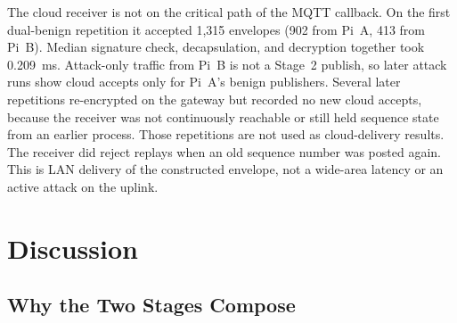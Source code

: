 \documentclass[journal]{IEEEtran}
\begin{document}
The cloud receiver is not on the critical path of the MQTT callback. On the first dual-benign repetition it accepted 1,315 envelopes (902 from Pi~A, 413 from Pi~B). Median signature check, decapsulation, and decryption together took 0.209~ms. Attack-only traffic from Pi~B is not a Stage~2 publish, so later attack runs show cloud accepts only for Pi~A's benign publishers. Several later repetitions re-encrypted on the gateway but recorded no new cloud accepts, because the receiver was not continuously reachable or still held sequence state from an earlier process. Those repetitions are not used as cloud-delivery results. The receiver did reject replays when an old sequence number was posted again. This is LAN delivery of the constructed envelope, not a wide-area latency or an active attack on the uplink.

\begin{table}[!t]
\centering
\caption{Three-Pi Campaign (Mean $\pm$ SD). E1--E2 and E4--E5 use three repetitions; E3 uses two (one interrupted repetition excluded). Delivery is the share of benign publishes with return code 0 that reached Stage~2. Precision and recall are per verdict and are undefined for E1, which has no attacks.}
\label{tab:three-pi}
\footnotesize
\setlength{\tabcolsep}{3pt}
\end{table}

\section{Discussion}
\label{sec:discussion}

\subsection{Why the Two Stages Compose}
\end{document}

